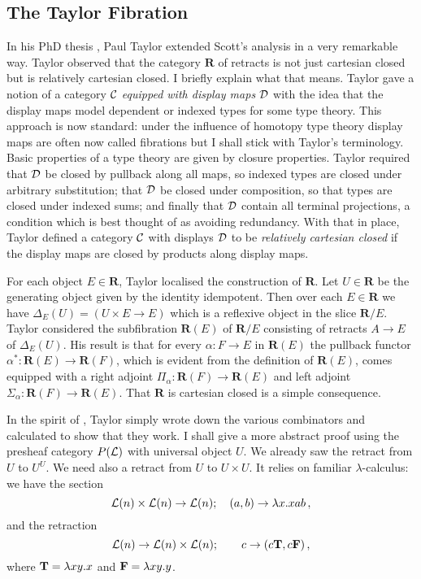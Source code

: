 \documentclass[12pt, amstex, amssymb]{article}
\newcommand{\mcat}{\cal}
\newcommand{\cat}{\mathbf}
\begin{document}
\subsection{The Taylor Fibration}\label{taylor}

In his PhD thesis \cite{Tay86},
Paul Taylor extended Scott's analysis in a very remarkable way. 
Taylor observed that the category ${\cat R}$ of retracts 
is not just cartesian closed but is relatively cartesian closed. 
I briefly explain what that means. Taylor gave a notion of a 
category $\cal C$ {\em equipped with display maps}
$\cal D$ with the idea that the display maps model dependent or indexed types
for some type theory. This approach is now standard: under the influence of
homotopy type theory display maps are often now called fibrations but I shall
stick with Taylor's terminology. Basic properties of a type theory
are given by closure properties. Taylor required that $\cal D$ be closed by 
pullback along all maps, so indexed types are closed under 
arbitrary substitution; that $\cal D$ be closed under composition,
so that types are closed under indexed sums; and finally that $\cal D$ 
contain all terminal projections, a condition which is best thought
of as avoiding redundancy. With that in place, Taylor defined a
category $\cal C$ with displays $\cal D$ to be {\em relatively
cartesian closed} if the display maps are closed by products along
display maps.

For each object $E \in {\cat R}$,
Taylor localised the construction of $\cat R$.
Let $U \in {\cat R}$ be the generating object given by the
identity idempotent. Then over each $E \in {\cat R}$ we have
$\Delta_E  (U) = (U \times E \to E)$ which is a reflexive 
object in the slice ${\cat R}/E$. Taylor considered 
the subfibration ${\cat R}(E)$
of ${\cat R}/E$ consisting of retracts $A \to E$ of $\Delta_E  (U)$.
His result is that for every $\alpha: F \to E$ in ${\cat R} (E)$
the pullback functor $\alpha^* :{\cat R}(E) \to {\cat R}(F)$, which is
evident from the definition of ${\cat R}(E)$, comes equipped
with a right adjoint  $\Pi_{\alpha} : {\cat R}(F) \to {\cat R}(E)$
and left adjoint 
$\Sigma_{\alpha} : {\cat R}(F) \to {\cat R}(E)$. That
$\cat R$ is cartesian closed is a simple consequence.

In the spirit of \cite{Scott80}, Taylor
simply wrote down the various
combinators and calculated to show that they work. 
I shall give a more abstract proof using the presheaf category
$P({\mcat L})$ with universal object $U$. 
We already saw the retract from $U$ to $U^U$. We need also
a retract from $U$ to $U \times U$.
It relies on familiar $\lambda$-calculus: we have the section
\[
{\mcat L}(n) \times {\mcat L}(n) \to {\mcat L}(n) ; \quad
(a,b) \to \lambda x. xab \, ,
\]
and the retraction
\[
{\mcat L}(n) \to {\mcat L}(n) \times {\mcat L}(n) ; \qquad
c \to (c {\bf T}, c {\bf F}) \, ,
\]
where ${\bf T} = \lambda xy . x$ and ${\bf F} = \lambda xy . y$.
\end{document}
